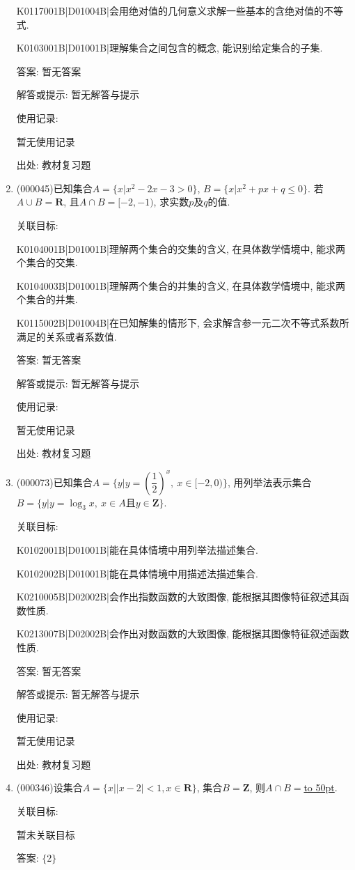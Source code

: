 \documentclass[10pt,a4paper]{article}
\newcommand{\blank}[1]{\underline{\hbox to #1pt{}}}
\begin{document}
\begin{enumerate}[1.]
K0117001B|D01004B|会用绝对值的几何意义求解一些基本的含绝对值的不等式.

K0103001B|D01001B|理解集合之间包含的概念, 能识别给定集合的子集.

答案: 暂无答案

解答或提示: 暂无解答与提示

使用记录:

暂无使用记录


出处: 教材复习题
\item { (000045)}已知集合$A=\{x|x^2-2x-3>0\}$, $B=\{x|x^2+px+q\le 0\}$. 若$A\cup B=\mathbf{R}$, 且$A\cap B=[-2,-1)$, 求实数$p$及$q$的值.


关联目标:

K0104001B|D01001B|理解两个集合的交集的含义, 在具体数学情境中, 能求两个集合的交集.

K0104003B|D01001B|理解两个集合的并集的含义, 在具体数学情境中, 能求两个集合的并集.

K0115002B|D01004B|在已知解集的情形下, 会求解含参一元二次不等式系数所满足的关系或者系数值.

答案: 暂无答案

解答或提示: 暂无解答与提示

使用记录:

暂无使用记录


出处: 教材复习题
\item { (000073)}已知集合$A=\{y|y=(\dfrac 12)^x,\  x\in [-2, 0)\}$, 用列举法表示集合$B=\{y|y=\log_3x,\  x\in A\text{且}y\in \mathbf{Z}\}$.


关联目标:

K0102001B|D01001B|能在具体情境中用列举法描述集合.

K0102002B|D01001B|能在具体情境中用描述法描述集合.

K0210005B|D02002B|会作出指数函数的大致图像, 能根据其图像特征叙述其函数性质.

K0213007B|D02002B|会作出对数函数的大致图像, 能根据其图像特征叙述函数性质.

答案: 暂无答案

解答或提示: 暂无解答与提示

使用记录:

暂无使用记录


出处: 教材复习题
\item { (000346)}设集合$A=\{x||x-2|<1,x\in \mathbf{R}\}$, 集合$B=\mathbf{Z}$, 则$A\cap B=$\blank{50}.


关联目标:

暂未关联目标

答案: $\{2\}$


\end{enumerate}
\end{document}
